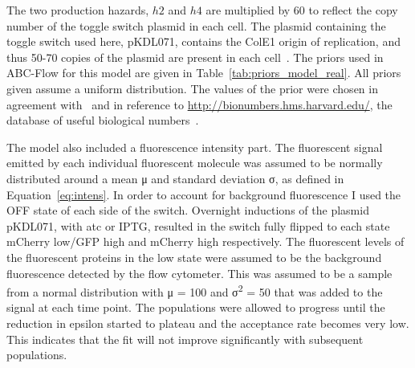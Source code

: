 The two production hazards, $h2$ and $h4$ are multiplied by 60 to reflect the copy number of the toggle switch plasmid in each cell. The plasmid containing the toggle switch used here, pKDL071, contains the ColE1 origin of replication, and thus 50-70 copies of the plasmid are present in each cell~\autocite{Milo:2010cz}. The priors used in ABC-Flow for this model are given in Table~\ref{tab:priors_model_real}. All priors given assume a uniform distribution. The values of the prior were chosen in agreement with~\autocite{Lillacci:2013hu} and in reference to \url{http://bionumbers.hms.harvard.edu/}, the database of useful biological numbers~\autocite{Milo:2010cz}. 

The model also included a fluorescence intensity part. The fluorescent signal emitted by each individual fluorescent molecule was assumed to be normally distributed around a mean μ and standard deviation σ, as defined in Equation~\ref{eq:intens}. In order to account for background fluorescence I used the OFF state of each side of the switch. Overnight inductions of the plasmid pKDL071, with \acrshort{atc} or IPTG, resulted in the switch fully flipped to each state mCherry low/GFP high and mCherry high respectively. The fluorescent levels of the fluorescent proteins in the low state were assumed to be the background fluorescence detected by the flow cytometer. This was assumed to be a sample from a normal distribution with μ = 100 and σ\textsuperscript{2} = 50 that was added to the signal at each time point. The populations were allowed to progress until the reduction in epsilon started to plateau and the acceptance rate becomes very low. This indicates that the fit will not improve significantly with subsequent populations.





